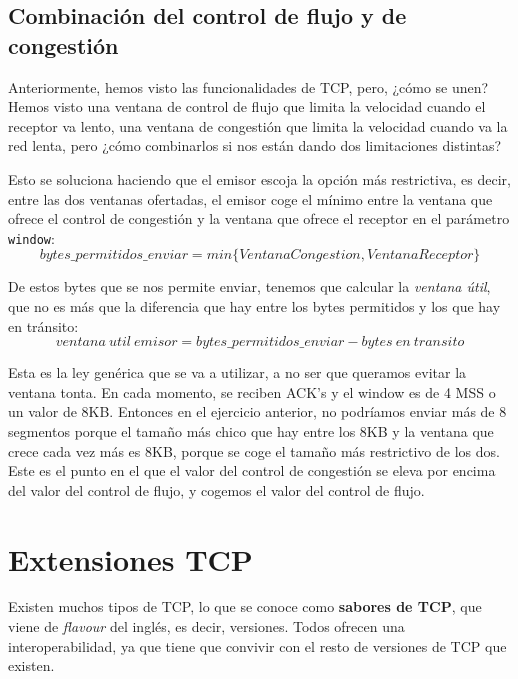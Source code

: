 \documentclass[10pt,a4paper,spanish]{report}
\begin{document}
\subsection{\textcolor{tema3}Combinación del control de flujo y de congestión}

Anteriormente, hemos visto las funcionalidades de TCP, pero, ¿cómo se unen? Hemos visto una ventana de control de flujo que limita la velocidad cuando el receptor va lento, una ventana de congestión que limita la velocidad cuando va la red lenta, pero ¿cómo combinarlos si nos están dando dos limitaciones distintas?

Esto se soluciona haciendo que el emisor escoja la opción más restrictiva, es decir, entre las dos ventanas ofertadas, el emisor coge el mínimo entre la ventana que ofrece el control de congestión y la ventana que ofrece el receptor en el parámetro \texttt{window}:
\begin{displaymath}
  bytes\_permitidos\_enviar = min\Big\{VentanaCongestion, VentanaReceptor\Big\}
\end{displaymath}

De estos bytes que se nos permite enviar, tenemos que calcular la \textit{\textcolor{tema3}{ventana útil}}, que no es más que la diferencia que hay entre los bytes permitidos y los que hay en tránsito:
\begin{displaymath}
  ventana~util~emisor=bytes\_permitidos\_enviar-bytes~en~transito
\end{displaymath}

Esta es la ley genérica que se va a utilizar, a no ser que queramos evitar la ventana tonta. En cada momento, se reciben ACK's y el window es de 4 MSS o un valor de 8KB. Entonces en el ejercicio anterior, no podríamos enviar más de 8 segmentos porque el tamaño más chico que hay entre los 8KB y la ventana que crece cada vez más es 8KB, porque se coge el tamaño más restrictivo de los dos. Este es el punto en el que el valor del control de congestión se eleva por encima del valor del control de flujo, y cogemos el valor del control de flujo.

\section{\textcolor{tema3}Extensiones TCP}

Existen muchos tipos de TCP, lo que se conoce como \textbf{\textcolor{tema3}{sabores de TCP}}, que viene de \textit{\textcolor{tema3}{flavour}} del inglés, es decir, versiones. Todos ofrecen una interoperabilidad, ya que tiene que convivir con el resto de versiones de TCP que existen.
\end{document}
